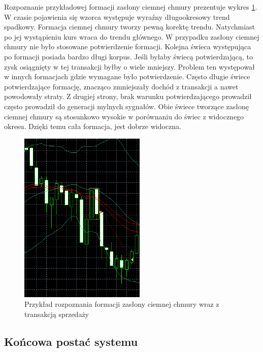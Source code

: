 \documentclass[pdflatex,11pt]{aghdpl}
\begin{document}
Rozpoznanie przykładowej formacji zasłony ciemnej chmury prezentuje wykres \ref{przyklad_zaslona}. W czasie pojawienia się wzorca występuje wyraźny długookresowy trend spadkowy. Formacja ciemnej chmury tworzy pewną korektę trendu. Natychmiast po jej wystąpieniu kurs wraca do trendu głównego. W przypadku zasłony ciemnej chmury nie było stosowane potwierdzenie formacji. Kolejna świeca występująca po formacji posiada bardzo długi korpus. Jeśli byłaby świecą potwierdzającą, to zysk osiągnięty w tej transakcji byłby o wiele mniejszy. Problem ten występował w innych formacjach gdzie wymagane było potwierdzenie. Często długie świece potwierdzające formację, znacząco zmniejszały dochód z transakcji a nawet powodowały straty. Z drugiej strony, brak warunku potwierdzającego prowadził często prowadził do generacji mylnych sygnałów. Obie świece tworzące zasłonę ciemnej chmury są stosunkowo wysokie w porównaniu do świec z widocznego okresu. Dzięki temu cała formacja, jest dobrze widoczna.
\begin{figure}[h!]
\begin{center}
\includegraphics[width=6cm]{darkcloudcover/przyklad.png}
\caption{Przykład rozpoznania formacji zasłony ciemnej chmury wraz z transakcją sprzedaży}
\label{przyklad_zaslona}
\end{center}
\end{figure} 

\subsection{Końcowa postać systemu}
\paragraph{}
\end{document}
